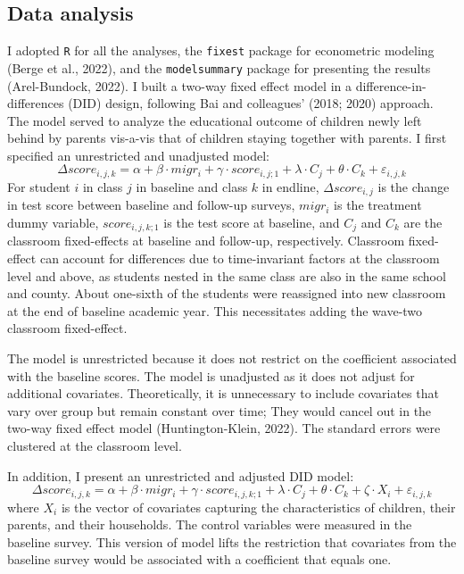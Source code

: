 \documentclass[
  man,floatsintext]{apa7}
\begin{document}
\hypertarget{data-analysis}{%
\subsection{Data analysis}\label{data-analysis}}

I adopted \texttt{R} for all the analyses, the \texttt{fixest} package for econometric modeling (Berge et al., 2022), and the \texttt{modelsummary} package for presenting the results (Arel-Bundock, 2022). I built a two-way fixed effect model in a difference-in-differences (DID) design, following Bai and colleagues' (2018; 2020) approach. The model served to analyze the educational outcome of children newly left behind by parents vis-a-vis that of children staying together with parents. I first specified an unrestricted and unadjusted model: \[\Delta score_{i,j,k} = \alpha + \beta \cdot migr_{i} + \gamma \cdot score_{i,j;1} + \lambda \cdot C_{j} + \theta \cdot C_{k} + \varepsilon_{i,j,k}\] For student \(i\) in class \(j\) in baseline and class \(k\) in endline, \(\Delta score_{i,j}\) is the change in test score between baseline and follow-up surveys, \(migr_{i}\) is the treatment dummy variable, \(score_{i,j,k;1}\) is the test score at baseline, and \(C_{j}\) and \(C_{k}\) are the classroom fixed-effects at baseline and follow-up, respectively. Classroom fixed-effect can account for differences due to time-invariant factors at the classroom level and above, as students nested in the same class are also in the same school and county. About one-sixth of the students were reassigned into new classroom at the end of baseline academic year. This necessitates adding the wave-two classroom fixed-effect.

The model is unrestricted because it does not restrict on the coefficient associated with the baseline scores. The model is unadjusted as it does not adjust for additional covariates. Theoretically, it is unnecessary to include covariates that vary over group but remain constant over time; They would cancel out in the two-way fixed effect model (Huntington-Klein, 2022). The standard errors were clustered at the classroom level.

In addition, I present an unrestricted and adjusted DID model: \[\Delta score_{i,j,k} = \alpha + \beta \cdot migr_{i} + \gamma \cdot score_{i,j,k;1} + \lambda \cdot C_{j} + \theta \cdot C_{k} + \zeta \cdot X_{i} + \varepsilon_{i,j,k}\] where \(X_{i}\) is the vector of covariates capturing the characteristics of children, their parents, and their households. The control variables were measured in the baseline survey. This version of model lifts the restriction that covariates from the baseline survey would be associated with a coefficient that equals one.
\end{document}
